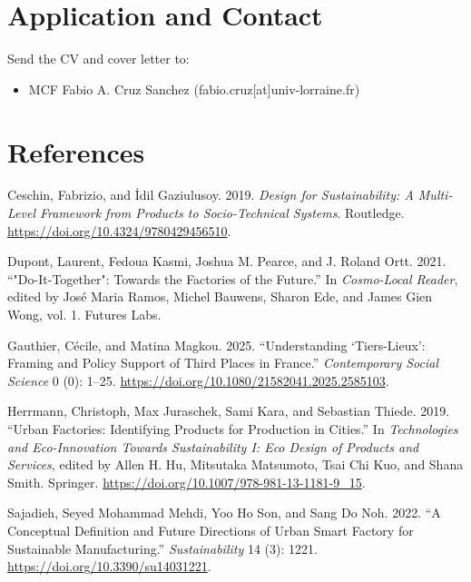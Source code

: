 \documentclass[
  english,
  11pt,
]{article}
\newlength{\cslhangindent}
\newenvironment{CSLReferences}[2] %
 {\begin{list}{}{%
  \setlength{\itemindent}{0pt}
  \setlength{\leftmargin}{0pt}
  \setlength{\parsep}{0pt}
  \ifodd #1
   \setlength{\leftmargin}{\cslhangindent}
   \setlength{\itemindent}{-1\cslhangindent}
  \fi
  \setlength{\itemsep}{#2\baselineskip}}}
 {\end{list}}
\providecommand{\tightlist}{%
  \setlength{\itemsep}{0pt}\setlength{\parskip}{0pt}}
\begin{document}
\section{Application and Contact}\label{application-and-contact}

Send the CV and cover letter to:

\begin{itemize}
\tightlist
\item
  MCF Fabio A. Cruz Sanchez (fabio.cruz{[}at{]}univ-lorraine.fr)
\end{itemize}

\section*{References}\label{references}

\protect{}\label{refs}
\begin{CSLReferences}{1}{1}
Ceschin, Fabrizio, and İdil Gaziulusoy. 2019. \emph{Design for
{Sustainability}: {A Multi}-Level {Framework} from {Products} to
{Socio}-Technical {Systems}}. Routledge.
\url{https://doi.org/10.4324/9780429456510}.

Dupont, Laurent, Fedoua Kasmi, Joshua M. Pearce, and J. Roland Ortt.
2021. {``"{Do-It-Together}": {Towards} the {Factories} of the
{Future}.''} In \emph{Cosmo-Local Reader}, edited by José Maria Ramos,
Michel Bauwens, Sharon Ede, and James Gien Wong, vol. 1. Futures Labs.

Gauthier, Cécile, and Matina Magkou. 2025. {``Understanding
{`Tiers-Lieux'}: Framing and Policy Support of Third Places in
{France}.''} \emph{Contemporary Social Science} 0 (0): 1--25.
\url{https://doi.org/10.1080/21582041.2025.2585103}.

Herrmann, Christoph, Max Juraschek, Sami Kara, and Sebastian Thiede.
2019. {``Urban {Factories}: {Identifying Products} for {Production} in
{Cities}.''} In \emph{Technologies and {Eco}-Innovation Towards
{Sustainability I}: {Eco Design} of {Products} and {Services}}, edited
by Allen H. Hu, Mitsutaka Matsumoto, Tsai Chi Kuo, and Shana Smith.
Springer. \url{https://doi.org/10.1007/978-981-13-1181-9_15}.

Sajadieh, Seyed Mohammad Mehdi, Yoo Ho Son, and Sang Do Noh. 2022. {``A
{Conceptual Definition} and {Future Directions} of {Urban Smart Factory}
for {Sustainable Manufacturing}.''} \emph{Sustainability} 14 (3): 1221.
\url{https://doi.org/10.3390/su14031221}.

\end{CSLReferences}
\end{document}
